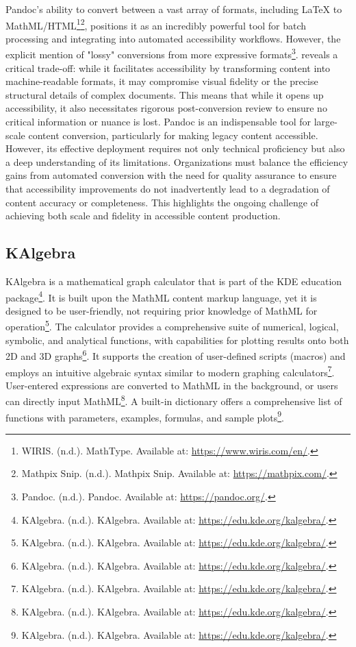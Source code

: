 Pandoc's ability to convert between a vast array of formats, including LaTeX to MathML/HTML\footnote{WIRIS. (n.d.). MathType. Available at: \url{https://www.wiris.com/en/}.}\footnote{Mathpix Snip. (n.d.). Mathpix Snip. Available at: \url{https://mathpix.com/}.}, positions it as an incredibly powerful tool for batch processing and integrating into automated accessibility workflows. However, the explicit mention of "lossy" conversions from more expressive formats\footnote{Pandoc. (n.d.). Pandoc. Available at: \url{https://pandoc.org/}.}. reveals a critical trade-off: while it facilitates accessibility by transforming content into machine-readable formats, it may compromise visual fidelity or the precise structural details of complex documents. This means that while it opens up accessibility, it also necessitates rigorous post-conversion review to ensure no critical information or nuance is lost. Pandoc is an indispensable tool for large-scale content conversion, particularly for making legacy content accessible. However, its effective deployment requires not only technical proficiency but also a deep understanding of its limitations. Organizations must balance the efficiency gains from automated conversion with the need for quality assurance to ensure that accessibility improvements do not inadvertently lead to a degradation of content accuracy or completeness. This highlights the ongoing challenge of achieving both scale and fidelity in accessible content production.

\subsection{KAlgebra}

KAlgebra is a mathematical graph calculator that is part of the KDE education package\footnote{KAlgebra. (n.d.). KAlgebra. Available at: \url{https://edu.kde.org/kalgebra/}.}. It is built upon the MathML content markup language, yet it is designed to be user-friendly, not requiring prior knowledge of MathML for operation\footnote{KAlgebra. (n.d.). KAlgebra. Available at: \url{https://edu.kde.org/kalgebra/}.}. The calculator provides a comprehensive suite of numerical, logical, symbolic, and analytical functions, with capabilities for plotting results onto both 2D and 3D graphs\footnote{KAlgebra. (n.d.). KAlgebra. Available at: \url{https://edu.kde.org/kalgebra/}.}. It supports the creation of user-defined scripts (macros) and employs an intuitive algebraic syntax similar to modern graphing calculators\footnote{KAlgebra. (n.d.). KAlgebra. Available at: \url{https://edu.kde.org/kalgebra/}.}. User-entered expressions are converted to MathML in the background, or users can directly input MathML\footnote{KAlgebra. (n.d.). KAlgebra. Available at: \url{https://edu.kde.org/kalgebra/}.}. A built-in dictionary offers a comprehensive list of functions with parameters, examples, formulas, and sample plots\footnote{KAlgebra. (n.d.). KAlgebra. Available at: \url{https://edu.kde.org/kalgebra/}.}.

